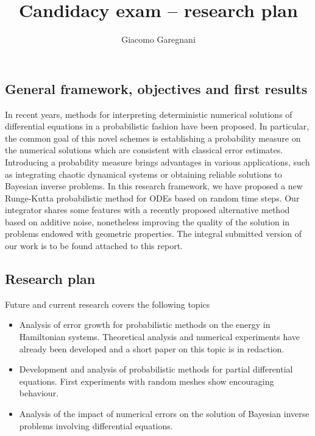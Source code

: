 \documentclass{scrartcl}
\title{\vspace{-2cm}Candidacy exam -- research plan}
\author{Giacomo Garegnani}
\date{}
\theoremstyle{theorem}
\theoremstyle{definition}
\begin{document}
	\maketitle
	
	\subsection*{General framework, objectives and first results}
	In recent years, methods for interpreting deterministic numerical solutions of differential equations in a probabilistic fashion have been proposed. In particular, the common goal of this novel schemes is establishing a probability measure on the numerical solutions which are consistent with classical error estimates. Introducing a probability measure brings advantages in various applications, such as integrating chaotic dynamical systems or obtaining reliable solutions to Bayesian inverse problems. In this research framework, we have proposed a new Runge-Kutta probabilistic method for ODEs based on random time steps. Our integrator shares some features with a recently proposed alternative method based on additive noise, nonetheless improving the quality of the solution in problems endowed with geometric properties. The integral submitted version of our work is to be found attached to this report.
		
	\subsection*{Research plan}
	Future and current research covers the following topics
	\begin{itemize}[label=-]
		\item Analysis of error growth for probabilistic methods on the energy in Hamiltonian systems. Theoretical analysis and numerical experiments have already been developed and a short paper on this topic is in redaction. 
		\item Development and analysis of probabilistic methods for partial differential equations. First experiments with random meshes show encouraging behaviour.
		\item Analysis of the impact of numerical errors on the solution of Bayesian inverse problems involving differential equations. 
	\end{itemize}
	
\end{document}
